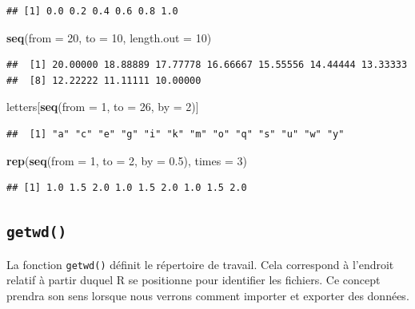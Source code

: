 \documentclass[]{book}
\newenvironment{Shaded}{\begin{snugshade}}{\end{snugshade}}
\newcommand{\DataTypeTok}[1]{\textcolor[rgb]{0.13,0.29,0.53}{#1}}
\newcommand{\DecValTok}[1]{\textcolor[rgb]{0.00,0.00,0.81}{#1}}
\newcommand{\FloatTok}[1]{\textcolor[rgb]{0.00,0.00,0.81}{#1}}
\newcommand{\KeywordTok}[1]{\textcolor[rgb]{0.13,0.29,0.53}{\textbf{#1}}}
\newcommand{\NormalTok}[1]{#1}
\begin{document}
\begin{verbatim}
## [1] 0.0 0.2 0.4 0.6 0.8 1.0
\end{verbatim}

\begin{Shaded}
\begin{Highlighting}[]
\KeywordTok{seq}\NormalTok{(}\DataTypeTok{from =} \DecValTok{20}\NormalTok{, }\DataTypeTok{to =} \DecValTok{10}\NormalTok{, }\DataTypeTok{length.out =} \DecValTok{10}\NormalTok{)}
\end{Highlighting}
\end{Shaded}

\begin{verbatim}
##  [1] 20.00000 18.88889 17.77778 16.66667 15.55556 14.44444 13.33333
##  [8] 12.22222 11.11111 10.00000
\end{verbatim}

\begin{Shaded}
\begin{Highlighting}[]
\NormalTok{letters[}\KeywordTok{seq}\NormalTok{(}\DataTypeTok{from =} \DecValTok{1}\NormalTok{, }\DataTypeTok{to =} \DecValTok{26}\NormalTok{, }\DataTypeTok{by =} \DecValTok{2}\NormalTok{)]}
\end{Highlighting}
\end{Shaded}

\begin{verbatim}
##  [1] "a" "c" "e" "g" "i" "k" "m" "o" "q" "s" "u" "w" "y"
\end{verbatim}

\begin{Shaded}
\begin{Highlighting}[]
\KeywordTok{rep}\NormalTok{(}\KeywordTok{seq}\NormalTok{(}\DataTypeTok{from =} \DecValTok{1}\NormalTok{, }\DataTypeTok{to =} \DecValTok{2}\NormalTok{, }\DataTypeTok{by =} \FloatTok{0.5}\NormalTok{), }\DataTypeTok{times =} \DecValTok{3}\NormalTok{)}
\end{Highlighting}
\end{Shaded}

\begin{verbatim}
## [1] 1.0 1.5 2.0 1.0 1.5 2.0 1.0 1.5 2.0
\end{verbatim}

\hypertarget{l015getwd}{%
\subsection{\texorpdfstring{\texttt{getwd()}}{getwd()}}\label{l015getwd}}

La fonction \texttt{getwd()} définit le répertoire de travail. Cela correspond à l'endroit relatif à partir duquel R se positionne pour identifier les fichiers. Ce concept prendra son sens lorsque nous verrons comment importer et exporter des données.
\end{document}
